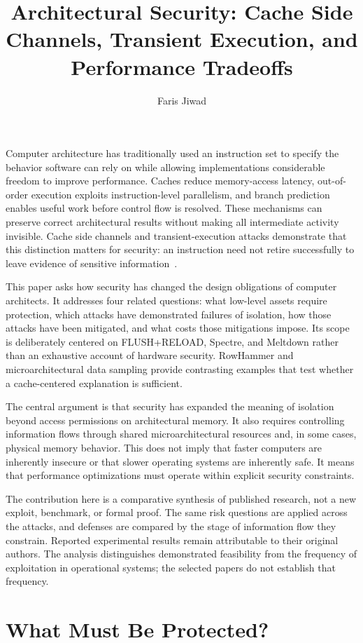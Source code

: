\documentclass[man,12pt,apacite,nofontenc,nolmodern,floatsintext]{apa6}
\title{Architectural Security: Cache Side Channels, Transient Execution, and Performance Tradeoffs}
\author{Faris Jiwad}
\affiliation{The George Washington University}
\begin{document}
\maketitle
Computer architecture has traditionally used an instruction set to specify the behavior software can rely on while allowing implementations considerable freedom to improve performance. Caches reduce memory-access latency, out-of-order execution exploits instruction-level parallelism, and branch prediction enables useful work before control flow is resolved. These mechanisms can preserve correct architectural results without making all intermediate activity invisible. Cache side channels and transient-execution attacks demonstrate that this distinction matters for security: an instruction need not retire successfully to leave evidence of sensitive information~\cite{spectre2019,meltdown2018,yarom2014}.

This paper asks how security has changed the design obligations of computer architects. It addresses four related questions: what low-level assets require protection, which attacks have demonstrated failures of isolation, how those attacks have been mitigated, and what costs those mitigations impose. Its scope is deliberately centered on FLUSH+RELOAD, Spectre, and Meltdown rather than an exhaustive account of hardware security. RowHammer and microarchitectural data sampling provide contrasting examples that test whether a cache-centered explanation is sufficient.

The central argument is that security has expanded the meaning of isolation beyond access permissions on architectural memory. It also requires controlling information flows through shared microarchitectural resources and, in some cases, physical memory behavior. This does not imply that faster computers are inherently insecure or that slower operating systems are inherently safe. It means that performance optimizations must operate within explicit security constraints.

The contribution here is a comparative synthesis of published research, not a new exploit, benchmark, or formal proof. The same risk questions are applied across the attacks, and defenses are compared by the stage of information flow they constrain. Reported experimental results remain attributable to their original authors. The analysis distinguishes demonstrated feasibility from the frequency of exploitation in operational systems; the selected papers do not establish that frequency.

\section{What Must Be Protected?}
\end{document}
